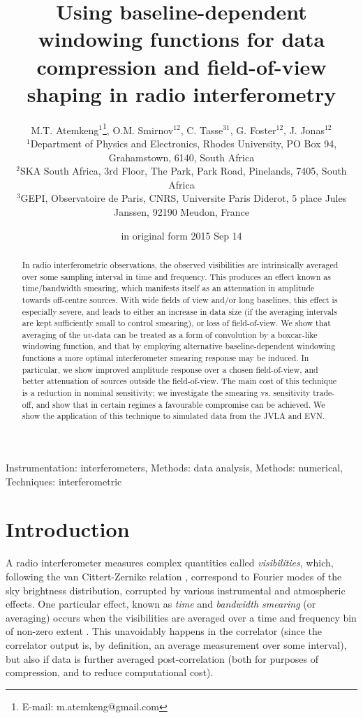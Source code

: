 \documentclass[useAMS,usenatbib]{mn2e}
\title[BDWFs for data compression and FoV shaping]{Using baseline-dependent windowing functions 
for data compression and field-of-view shaping in radio interferometry}
\author[M.T. Atemkeng , O.M. Smirnov, C. Tasse, G. Foster and J. Jonas]{M.T. 
Atemkeng$^{1}$\thanks{E-mail: m.atemkeng@gmail.com}, O.M. Smirnov$^{12}$, C. Tasse$^{31}$, G. Foster$^{12}$, J. Jonas$^{12}$ \\
$^1$Department of Physics and Electronics, Rhodes University, PO Box 94, Grahamstown, 6140, South Africa\\
$^2$SKA South Africa, 3rd Floor, The Park, Park Road, Pinelands, 7405, South Africa\\
$^3$GEPI, Observatoire de Paris, CNRS, Universite Paris Diderot, 5 place Jules Janssen, 92190 Meudon, France}
\begin{document}
\date{in original form 2015 Sep 14}

\pagerange{\pageref{firstpage}--\pageref{lastpage}} 

\maketitle

\label{firstpage}

\begin{abstract}


In radio interferometric observations, the observed visibilities are intrinsically averaged over some sampling interval
in time and frequency. This produces an effect known as time/bandwidth smearing, which manifests itself as an attenuation 
in amplitude towards off-centre sources. With wide fields of view and/or long baselines, this effect is especially severe,
and leads to either an increase in data size (if the averaging intervals are kept sufficiently small to control smearing), or 
loss of field-of-view. We show that averaging of the $uv$-data can be treated as a form of convolution by a boxcar-like 
windowing function, and that by employing alternative baseline-dependent windowing functions a more optimal interferometer 
smearing response may be induced. In particular, we show improved amplitude response over a chosen field-of-view, and 
better attenuation of sources outside the field-of-view. The main cost of this technique is a reduction in nominal 
sensitivity; we investigate the smearing vs. sensitivity trade-off, and show that in certain regimes a favourable 
compromise can be achieved. We show the application of this technique to simulated data from the JVLA and EVN.

\end{abstract}
\begin{keywords}
Instrumentation: interferometers, Methods: data analysis, Methods: numerical, Techniques: interferometric
\end{keywords}

\section[]{Introduction}

A radio interferometer measures complex quantities called \emph{visibilities}, which, following the van Cittert-Zernike 
relation \citep{thompson1999fundamentals,thompson2001fundamentals}, correspond to Fourier modes of the sky brightness distribution, corrupted by various instrumental 
and atmospheric effects. One particular effect, known as \emph{time} and \emph{bandwidth smearing} (or averaging) occurs 
when the visibilities are averaged over a time and frequency bin of non-zero extent \citep{bridle1989wide,bridle1999bandwidth}. This unavoidably happens in the correlator 
(since the correlator output is, by definition, an average measurement over some interval), but also if data is further 
averaged post-correlation (both for purposes of compression, and to reduce computational cost).
\end{document}
